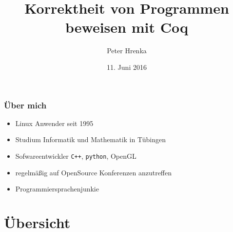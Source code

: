 \documentclass[aspectratio=169]{beamer}
\title{Korrektheit von Programmen beweisen mit Coq}
\institute{Linux Tag Tübingen 2016}
\author{Peter Hrenka}
\date{11. Juni 2016}
\begin{document}
\begin{frame}
\titlepage
\end{frame}
\begin{frame}
  \frametitle{Über mich}
  \begin{itemize}
    \item Linux Anwender seit 1995
    \item Studium Informatik und Mathematik in Tübingen
    \item Sofwareentwickler \texttt{C++}, \texttt{python}, OpenGL
    \item regelmäßig auf OpenSource Konferenzen anzutreffen
    \item Programmiersprachenjunkie
  \end{itemize}
\end{frame}
\section*{Übersicht}
\begin{frame}
  \tableofcontents
\end{frame}
\end{document}
